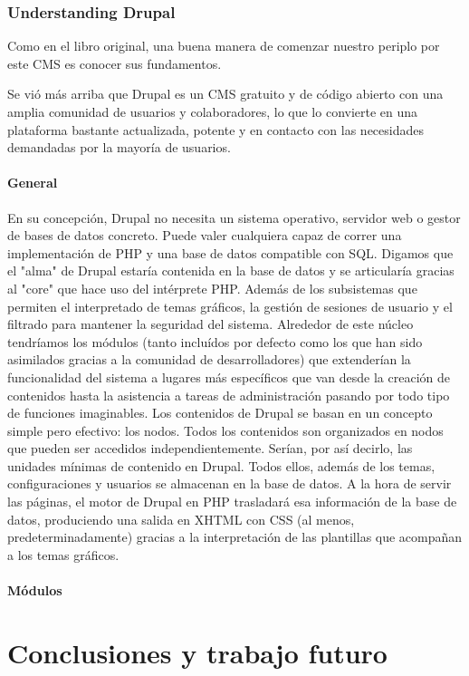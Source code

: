 \subsubsection{Understanding Drupal}

\par Como en el libro original, una buena manera de comenzar nuestro periplo por este CMS es conocer sus fundamentos.
\par Se vió más arriba que Drupal es un CMS gratuito y de código abierto con una amplia comunidad de usuarios y colaboradores, lo que lo convierte en una plataforma bastante actualizada, potente y en contacto con las necesidades demandadas por la mayoría de usuarios.

\paragraph{General} En su concepción, Drupal no necesita un sistema operativo, servidor web o gestor de bases de datos concreto. Puede valer cualquiera capaz de correr una implementación de PHP y una base de datos compatible con SQL. Digamos que el "alma" de Drupal estaría contenida en la base de datos y se articularía gracias al "core" que hace uso del intérprete PHP. Además de los subsistemas que permiten el interpretado de temas gráficos, la gestión de sesiones de usuario y el filtrado para mantener la seguridad del sistema. Alrededor de este núcleo tendríamos los módulos (tanto incluídos por defecto como los que han sido asimilados gracias a la comunidad de desarrolladores) que extenderían la funcionalidad del sistema a lugares más específicos que van desde la creación de contenidos hasta la asistencia a tareas de administración pasando por todo tipo de funciones imaginables.
Los contenidos de Drupal se basan en un concepto simple pero efectivo: los nodos. Todos los contenidos son organizados en nodos que pueden ser accedidos independientemente. Serían, por así decirlo, las unidades mínimas de contenido en Drupal. Todos ellos, además de los temas, configuraciones y usuarios se almacenan en la base de datos. A la hora de servir las páginas, el motor de Drupal en PHP trasladará esa información de la base de datos, produciendo una salida en XHTML con CSS (al menos, predeterminadamente) gracias a la interpretación de las plantillas que acompañan a los temas gráficos.

\paragraph{Módulos}





\section{Conclusiones y trabajo futuro}



